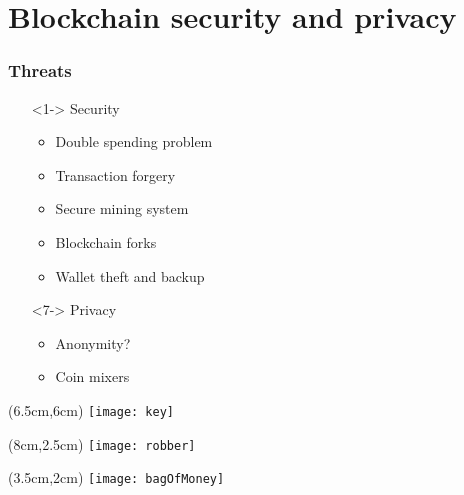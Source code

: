 \section{Blockchain security and privacy}
\begin{frame}
  \frametitle{Threats}

  \begin{itemize}
   \item[]<1-> Security
    \begin{itemize}
      \item<2-> Double spending problem
      \item<3-> Transaction forgery
      \item<4-> Secure mining system
      \item<5-> Blockchain forks
      \item<6-> Wallet theft and backup
    \end{itemize}
   \item[]<7-> Privacy
    \begin{itemize}
      \item<8-> Anonymity?
      \item<9-> Coin mixers
    \end{itemize}
  \end{itemize}

  \begin{textblock*}{5cm}(6.5cm,6cm)
    \texttt{[image: key]}
  \end{textblock*}

  \begin{textblock*}{5cm}(8cm,2.5cm)
    \texttt{[image: robber]}
  \end{textblock*}

  \begin{textblock*}{5cm}(3.5cm,2cm)
    \texttt{[image: bagOfMoney]}
  \end{textblock*}
\end{frame}
